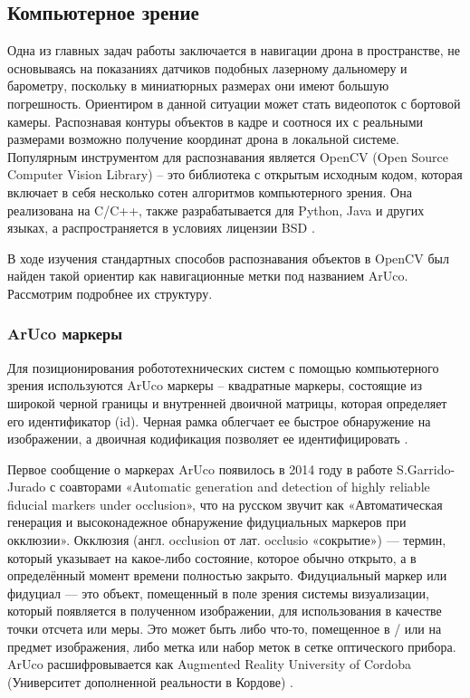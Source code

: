 \subsection{Компьютерное зрение}
Одна из главных задач работы заключается в навигации дрона в пространстве, не основываясь на показаниях датчиков подобных лазерному дальномеру и барометру, поскольку в миниатюрных размерах они имеют большую погрешность. Ориентиром в данной ситуации может стать видеопоток с бортовой камеры. Распознавая контуры объектов в кадре и соотнося их с реальными размерами возможно получение координат дрона в локальной системе. Популярным инструментом для распознавания является Open\-CV (Open Source Computer Vision Library) -- это библиотека с открытым исходным кодом, которая включает в себя несколько сотен алгоритмов компьютерного зрения. Она реализована на C/C++, также разрабатывается для Python, Java и других языках, а распространяется в условиях лицензии BSD \cite{opencv}.

В ходе изучения стандартных способов распознавания объектов в Open\-CV был найден такой ориентир как навигационные метки под названием ArUco. Рассмотрим подробнее их структуру.

\subsubsection{ArUco маркеры}

Для позиционирования робототехнических систем с помощью компьютерного зрения используются ArUco маркеры -- квадратные маркеры, состоящие из широкой черной границы и внутренней двоичной матрицы, которая определяет его идентификатор (id). Черная рамка облегчает ее быстрое обнаружение на изображении, а двоичная кодификация позволяет ее идентифицировать \cite{opencv}.

Первое сообщение о маркерах ArUco появилось в 2014 году в работе S.Garrido-Jurado с соавторами «Automatic generation and detection of highly reliable fiducial markers under occlusion», что на русском звучит как «Автоматическая генерация и высоконадежное обнаружение фидуциальных маркеров при окклюзии».
Окклюзия (англ. occlusion от лат. occlusio «сокрытие») — термин, который указывает на какое-либо состояние, которое обычно открыто, а в определённый момент времени полностью закрыто.
Фидуциальный маркер или фидуциал — это объект, помещенный в поле зрения системы визуализации, который появляется в полученном изображении, для использования в качестве точки отсчета или меры. Это может быть либо что-то, помещенное в / или на предмет изображения, либо метка или набор меток в сетке оптического прибора.
ArUco расшифровывается как Augmented Reality University of Cordoba (Университет дополненной реальности в Кордове) \cite{aruco}.

